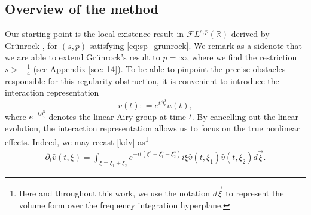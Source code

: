 \documentclass[%
11pt,  reqno]{amsart}
\newcommand{\5}{\textup{V}}
\DeclareMathOperator*{\intt}{\int}
\newcommand{\dx}{\partial_x}
\newcommand{\dt}{\partial_t}
\newtheorem{proposition}[theorem]{Proposition}
\theoremstyle{remark}
\newcommand{\R}{\mathbb{R}}
\numberwithin{equation}{section}
\numberwithin{theorem}{section}
\begin{document}
\subsection{Overview of the method}

	Our starting point is the local existence result in $\mathcal{F}L^{s,p}(\R)$ derived by Grünrock \cite{Grunrock_ldv_hier}, for $(s,p)$ satisfying \eqref{eq:sp_grunrock}. We remark as a sidenote that we are able to extend Grünrock's result to $p=\infty$, where we find the restriction $s>-\frac14$ (see Appendix \ref{sec:-14}).
	To be able to pinpoint the precise obstacles responsible for this regularity obstruction,  it is convenient to introduce the interaction representation \cite{Ginibre_interaction_rep}
	\begin{equation}\label{inter}
		v(t) : = e^{t\partial_x^3}u(t),
	\end{equation} 
	where $e^{-t\dx^3}$ denotes the linear Airy group at time $t$. By cancelling out the linear evolution, the interaction representation allows us to focus on the true nonlinear effects. Indeed, we may recast \eqref{kdv} as\footnote{Here and throughout this work, we use the notation $d\vec{\xi}$ to represent the volume form over the frequency integration hyperplane.}
	\begin{align}
		\label{dtv}
		\dt{\widehat{v}}(t,\xi) = \intt_{\xi = \xi_1+\xi_2} e^{-it (\xi^3 -\xi_1^3 -
			\xi^3_2)} i \xi \widehat{v}(t,\xi_1) \widehat{v}(t,\xi_2)  d\vec{\xi}
		.
	\end{align}
\end{document}
